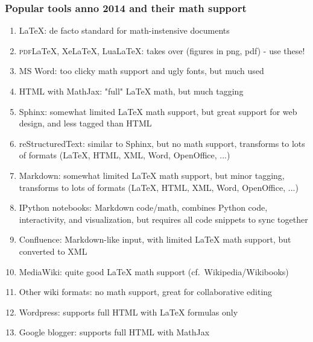 \documentclass{beamer}
\begin{document}
\begin{frame}
\frametitle{Popular tools anno 2014 and their math support}

\begin{block}{}
\begin{enumerate}
\item {\LaTeX}: de facto standard for math-instensive documents

\item \textsc{pdf}{\LaTeX}, XeLaTeX, LuaLaTeX: takes over (figures in png, pdf) - use these!

\item MS Word: too clicky math support and ugly fonts, but much used

\item HTML with MathJax: "full" {\LaTeX} math, but much tagging

\item Sphinx: somewhat limited {\LaTeX} math support, but great support for web design, and less tagged than HTML

\item reStructuredText: similar to Sphinx, but no math support, transforms to lots of formats ({\LaTeX}, HTML, XML, Word, OpenOffice, ...)

\item Markdown: somewhat limited {\LaTeX} math support, but minor tagging, transforms to lots of formats ({\LaTeX}, HTML, XML, Word, OpenOffice, ...)

\item IPython notebooks: Markdown code/math, combines Python code, interactivity, and visualization, but requires all code snippets to sync together

\item Confluence: Markdown-like input, with limited {\LaTeX} math support, but converted to XML

\item MediaWiki: quite good {\LaTeX} math support (cf.~Wikipedia/Wikibooks)

\item Other wiki formats: no math support, great for collaborative editing

\item Wordpress: supports full HTML with {\LaTeX} formulas only

\item Google blogger: supports full HTML with MathJax
\end{enumerate}

\noindent
\end{block}
\end{frame}
\end{document}
